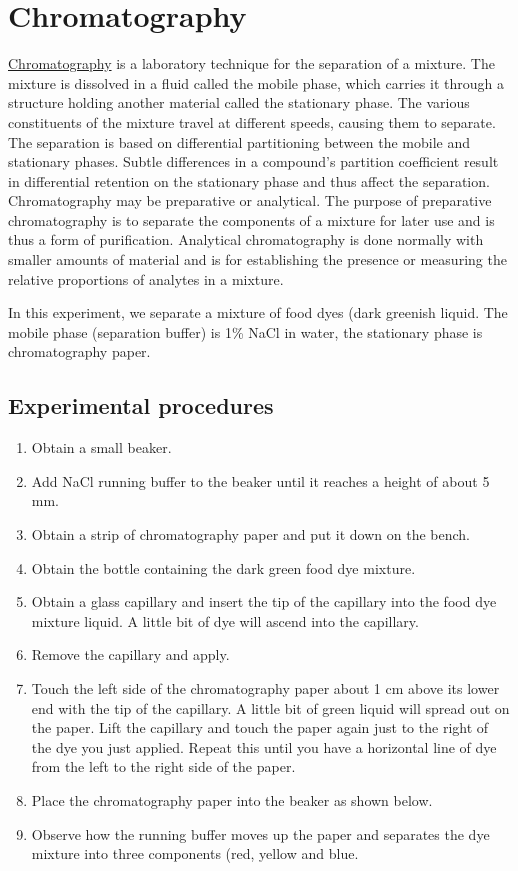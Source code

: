 \section{Chromatography}\label{chromatography}

\href{https://en.wikipedia.org/wiki/Chromatography}{Chromatography} is a
laboratory technique for the separation of a mixture. The mixture is
dissolved in a fluid called the mobile phase, which carries it through a
structure holding another material called the stationary phase. The
various constituents of the mixture travel at different speeds, causing
them to separate. The separation is based on differential partitioning
between the mobile and stationary phases. Subtle differences in a
compound's partition coefficient result in differential retention on the
stationary phase and thus affect the separation. Chromatography may be
preparative or analytical. The purpose of preparative chromatography is
to separate the components of a mixture for later use and is thus a form
of purification. Analytical chromatography is done normally with smaller
amounts of material and is for establishing the presence or measuring
the relative proportions of analytes in a mixture.

In this experiment, we separate a mixture of food dyes (dark greenish
liquid. The mobile phase (separation buffer) is 1\% NaCl in water, the
stationary phase is chromatography paper.

\subsection{Experimental procedures}\label{experimental-procedures-27}

\begin{enumerate}
\def\labelenumi{\arabic{enumi}.}
\tightlist
\item
  Obtain a small beaker.
\item
  Add NaCl running buffer to the beaker until it reaches a height of
  about 5 mm.
\item
  Obtain a strip of chromatography paper and put it down on the bench.
\item
  Obtain the bottle containing the dark green food dye mixture.
\item
  Obtain a glass capillary and insert the tip of the capillary into the
  food dye mixture liquid. A little bit of dye will ascend into the
  capillary.
\item
  Remove the capillary and apply.
\item
  Touch the left side of the chromatography paper about 1 cm above its
  lower end with the tip of the capillary. A little bit of green liquid
  will spread out on the paper. Lift the capillary and touch the paper
  again just to the right of the dye you just applied. Repeat this until
  you have a horizontal line of dye from the left to the right side of
  the paper.
\item
  Place the chromatography paper into the beaker as shown below.
\item
  Observe how the running buffer moves up the paper and separates the
  dye mixture into three components (red, yellow and blue.
\end{enumerate}

